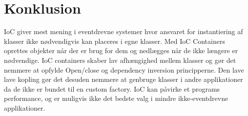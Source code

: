 \thispagestyle{fancy}
\chapter{Konklusion}
\label{chp:Konklusion}
IoC giver mest mening i eventdrevne systemer hvor ansvaret for instantiering af klasser ikke nødvendigvis kan placeres i egne klasser. Med IoC Containers oprettes objekter når der er brug for dem og nedlægges når de ikke længere er nødvendige. 
IoC containers skaber lav afhængighed mellem klasser og gør det nemmere at opfylde Open/close og dependency inversion principperne.
Den lave lave kopling gør det desuden nemmere at genbruge klasser i andre applikationer da de ikke er bundet til en custom factory.
IoC kan påvirke et programs performance, og er muligvis ikke det bedste valg i mindre ikke-eventdrevne applikationer. 